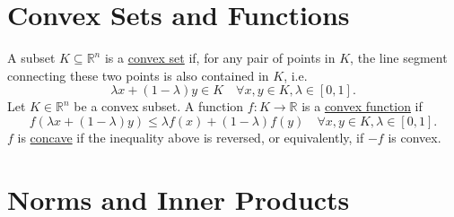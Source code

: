 \section*{Convex Sets and Functions}

\begin{definition}[]
A subset $K \subseteq \mathbb{R}^n$ is a \underline{convex set} if, for any pair of points in $K$, the line 
segment connecting these two points is also contained in $K$, i.e. 
\[ \lambda x + (1 - \lambda) y \in K \quad \forall x, y \in K, \lambda \in [0, 1]. \]
Let $K \in \mathbb{R}^n$ be a convex subset. A function $f: K \to \mathbb{R}$ is a \underline{convex 
function} if 
\[ f(\lambda x + (1 - \lambda) y) \leq \lambda f(x) + (1 - \lambda) f(y) \quad \forall x, y \in K, 
\lambda \in [0, 1]. \]	
$f$ is \underline{concave} if the inequality above is reversed, or equivalently, if $-f$ is convex.
\end{definition}


\section*{Norms and Inner Products}

